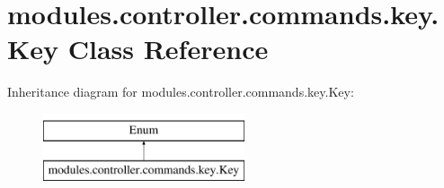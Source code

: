 \hypertarget{classmodules_1_1controller_1_1commands_1_1key_1_1_key}{}\section{modules.\+controller.\+commands.\+key.\+Key Class Reference}
\label{classmodules_1_1controller_1_1commands_1_1key_1_1_key}
Inheritance diagram for modules.\+controller.\+commands.\+key.\+Key\+:\begin{figure}[H]
\begin{center}
\leavevmode
\includegraphics[height=2.000000cm]{classmodules_1_1controller_1_1commands_1_1key_1_1_key}
\end{center}
\end{figure}
